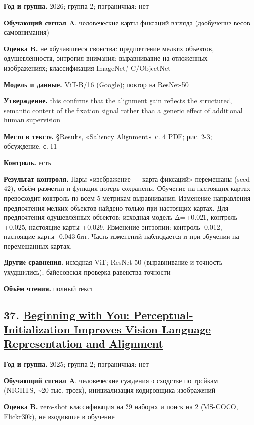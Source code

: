 \textbf{Год и группа.} 2026; группа 2; пограничная: нет

\textbf{Обучающий сигнал A.} человеческие карты фиксаций взгляда (дообучение весов самовнимания)

\textbf{Оценка B.} не обучавшиеся свойства: предпочтение мелких объектов, одушевлённости, энтропия внимания; выравнивание на отложенных изображениях; классификация ImageNet/-C/ObjectNet

\textbf{Модель и данные.} ViT-B/16 (Google); повтор на ResNet-50

\textbf{Утверждение.} this confirms that the alignment gain reflects the structured, semantic content of the fixation signal rather than a generic effect of additional human supervision

\textbf{Место в тексте.} §Results, «Saliency Alignment», с. 4 PDF; рис. 2-3; обсуждение, с. 11

\textbf{Контроль.} есть

\textbf{Результат контроля.} Пары «изображение — карта фиксаций» перемешаны (seed 42), объём разметки и функция потерь сохранены. Обучение на настоящих картах превосходит контроль по всем 5 метрикам выравнивания. Изменение направления предпочтения мелких объектов найдено только при настоящих картах. Для предпочтения одушевлённых объектов: исходная модель Δ=+0.021, контроль +0.025, настоящие карты +0.029. Изменение энтропии: контроль -0.012, настоящие карты -0.043 бит. Часть изменений наблюдается и при обучении на перемешанных картах.

\textbf{Другие сравнения.} исходная ViT; ResNet-50 (выравнивание и точность ухудшились); байесовская проверка равенства точности

\textbf{Объём чтения.} полный текст


\subsection*{37. \href{https://doi.org/10.48550/arxiv.2505.14204}{Beginning with You: Perceptual-Initialization Improves Vision-Language Representation and Alignment}}

\textbf{Год и группа.} 2025; группа 2; пограничная: нет

\textbf{Обучающий сигнал A.} человеческие суждения о сходстве по тройкам (NIGHTS, \textasciitilde{}20 тыс. троек), инициализация кодировщика изображений

\textbf{Оценка B.} zero-shot классификация на 29 наборах и поиск на 2 (MS-COCO, Flickr30k), не входившие в обучение

